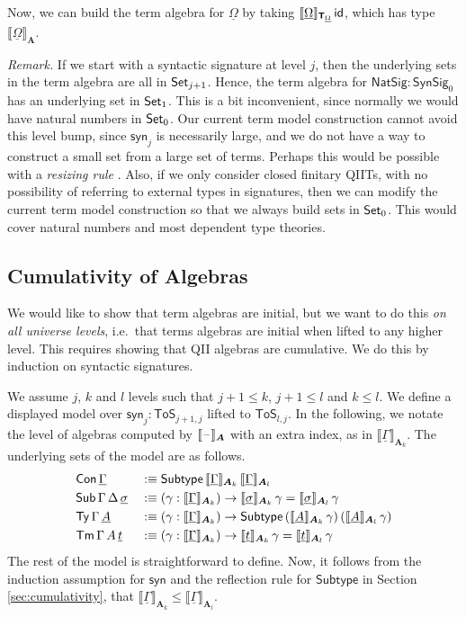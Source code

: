 \documentclass[sigplan,review,anonymous]{acmart}\settopmatter{printfolios=true,printccs=false,printacmref=false}
\newcommand{\ToS}{\mathsf{ToS}}
\newcommand{\Subtype}{\mathsf{Subtype}}
\newcommand{\NatSig}{\mathsf{NatSig}}
\newcommand{\syn}{\mathsf{syn}}
\newcommand{\SynSig}{\mathsf{SynSig}}
\newcommand{\bA}{\boldsymbol{A}}
\newcommand{\bT}{\boldsymbol{\mathsf{T}}}
\newcommand{\ul}[1]{\underline{#1}}
\newcommand{\ulGamma}{\ul{\Gamma}}
\newcommand{\ulOmega}{\ul{\Omega}}
\newcommand{\ulsigma}{\ul{\sigma}}
\newcommand{\ult}{\ul{t}}
\newcommand{\ulA}{\ul{A}}
\newcommand{\llb}{\llbracket}
\newcommand{\rrb}{\rrbracket}
\begin{document}
Now, we can build the term algebra for $\ulOmega$ by taking
$\llb\ulOmega\rrb_{\bT_{\ulOmega}}\,\id$, which has type $\llb\ulOmega\rrb_{\bA}$.

\emph{Remark.} If we start with a syntactic signature at level $j$, then the
underlying sets in the term algebra are all in $\mathsf{Set}_{j+1}$. Hence, the term
algebra for $\NatSig : \SynSig_0$ has an underlying set in $\mathsf{Set}_1$. This is
a bit inconvenient, since normally we would have natural numbers in $\mathsf{Set}_0$. Our
current term model construction cannot avoid this level bump, since $\syn_j$ is
necessarily large, and we do not have a way to construct a small set from
a large set of terms. Perhaps this would be possible with a \emph{resizing rule}
\cite{voevodsky2011resizing}. Also, if we only consider closed finitary QIITs,
with no possibility of referring to external types in signatures, then we can
modify the current term model construction so that we always build sets in
$\mathsf{Set}_0$. This would cover natural numbers and most dependent type theories.

\subsection{Cumulativity of Algebras}

We would like to show that term algebras are initial, but we want to do this
\emph{on all universe levels}, i.e.\ that terms algebras are initial when lifted
to any higher level. This requires showing that QII algebras are
cumulative. We do this by induction on syntactic signatures.

\begin{definition} We assume $j$, $k$ and $l$ levels such that $j+1 \leq k$, $j+1 \leq l$ and $k \leq l$. We define a displayed model over $\syn_j : \ToS_{j+1, j}$ lifted to
$\ToS_{l, j}$. In the following, we notate the level of algebras computed by
  $\llb\blank\rrb_{\bA}$ with an extra index, as in
  $\llb\ulGamma\rrb_{\bA_k}$. The underlying sets of the model are as follows.
\begin{alignat*}{3}
  & \Con\,\ulGamma && :\equiv \Subtype\,\llb\ulGamma\rrb_{\bA_k}\,\llb\ulGamma\rrb_{\bA_l}\\
  & \Sub\,\Gamma\,\Delta\,\ulsigma && :\equiv (\gamma : \llb\ulGamma\rrb_{\bA_k})\ra
  \llb\ulsigma\rrb_{\bA_k}\,\gamma = \llb\ulsigma\rrb_{\bA_l}\,\gamma\\
  & \Ty\,\Gamma\,\ulA &&:\equiv (\gamma : \llb\ulGamma\rrb_{\bA_k})\ra
      \Subtype\,(\llb\ulA\rrb_{\bA_k}\,\gamma)\,(\llb\ulA\rrb_{\bA_l}\,\gamma)\\
  & \Tm\,\Gamma\,A\,\ult &&:\equiv (\gamma : \llb\ulGamma\rrb_{\bA_k})\ra
     \llb\ult\rrb_{\bA_k}\,\gamma = \llb\ult\rrb_{\bA_l}\,\gamma
\end{alignat*}
The rest of the model is straightforward to define. Now, it follows from the
induction assumption for $\syn$ and the reflection rule for $\Subtype$ in
Section \ref{sec:cumulativity}, that $\llb\ulGamma\rrb_{\bA_k} \leq
\llb\ulGamma\rrb_{\bA_l}$.
\end{definition}
\end{document}
